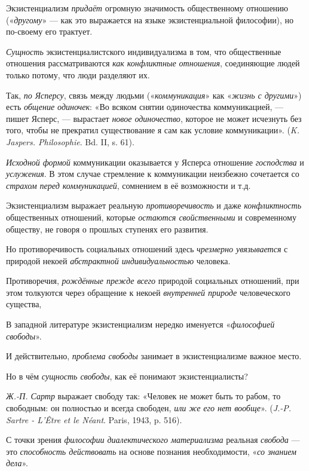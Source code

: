 \documentclass[a4paper,14pt,russian]{extreport}
\begin{document}
Экзистенциализм \emph{придаёт} огромную значимость общественному отношению («\emph{другому}» --- как это выражается на языке экзистенциальной философии), но по-своему его трактует.

\emph{Сущность} экзистенциалистского индивидуализма в том, что общественные отношения рассматриваются \emph{как конфликтные отношения}, соединяющие людей только потому, что люди разделяют их.

Так, \emph{по Ясперсу}, связь между людьми («\emph{коммуникация}» как «\emph{жизнь с другими}») есть \emph{общение одиночек}: «Во всяком снятии одиночества коммуникацией, --- пишет Ясперс, --- вырастает \emph{новое одиночество}, которое не может исчезнуть без того, чтобы не прекратил существование я сам как условие коммуникации». (\emph{K. Jaspers. Philosophie}. Bd. II, s. 61).

\emph{Исходной формой} коммуникации оказывается у Ясперса отношение \emph{господства} и \emph{услужения}. В этом случае стремление к коммуникации неизбежно сочетается со \emph{страхом перед коммуникацией}, сомнением в её возможности и т.д.

Экзистенциализм выражает реальную \emph{противоречивость} и даже \emph{конфликтность} общественных отношений, которые \emph{остаются свойственными} и современному обществу, не говоря о прошлых ступенях его развития.

Но противоречивость социальных отношений здесь \emph{чрезмерно увязывается} с природой некоей \emph{абстрактной индивидуальностью} человека.

Противоречия, \emph{рождённые прежде всего} природой социальных отношений, при этом толкуются через обращение к некоей \emph{внутренней природе} человеческого существа,

В западной литературе экзистенциализм нередко именуется «\emph{философией свободы}».

И действительно, \emph{проблема свободы} занимает в экзистенциализме важное место.

Но в чём \emph{сущность свободы}, как её понимают экзистенциалисты?

\emph{Ж.-П. Сартр} выражает свободу так: «Человек не может быть то рабом, то свободным: он полностью и всегда свободен, \emph{или же его нет вообще}». (\emph{J.-P. Sartre - L'Être et le Néant}. Paris, 1943, p. 516).

С точки зрения \emph{философии диалектического материализма} реальная \emph{свобода} --- это \emph{способность действовать} на основе познания необходимости, «\emph{со знанием дела}».
\end{document}
